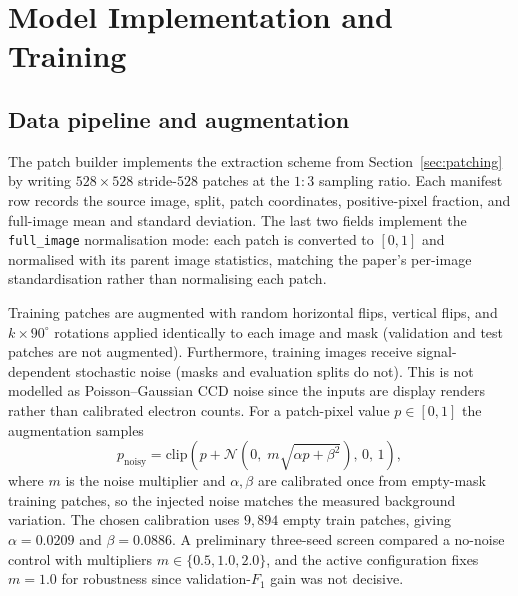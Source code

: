 \documentclass{cam-thesis}
\begin{document}
\chapter{Model Implementation and Training}
\label{ch:pipeline}

\section{Data pipeline and augmentation}
\label{sec:datapipeline}

The patch builder implements the extraction scheme from
Section~\ref{sec:patching} by writing $528\times528$ stride-$528$ patches at
the $1{:}3$ sampling ratio. Each manifest row records the source image,
split, patch coordinates, positive-pixel fraction, and full-image mean and standard
deviation. The last two fields implement the \texttt{full\_image}
normalisation mode: each patch is converted to $[0,1]$ and normalised with its
parent image statistics, matching the paper's per-image standardisation
rather than normalising each patch.

\label{sec:augmentation}

Training patches are augmented with random horizontal flips,
vertical flips, and $k\times90^{\circ}$ rotations applied identically to each
image and mask (validation and test patches are not augmented). Furthermore, training
images receive signal-dependent stochastic noise (masks and evaluation splits do not).
This is not modelled as Poisson--Gaussian CCD noise since the inputs are display renders
rather than calibrated electron counts.
For a patch-pixel value $p\in[0,1]$ the augmentation samples
\[
  p_{\mathrm{noisy}} =
  \mathrm{clip}\!\left(p + \mathcal{N}\!\left(0,\;
  m\sqrt{\alpha p + \beta^{2}}\right),\,0,\,1\right),
\]
where $m$ is the noise multiplier and $\alpha,\beta$ are calibrated once from
empty-mask training patches, so the injected noise matches the measured background
variation. The chosen calibration uses $9{,}894$ empty train patches, giving
$\alpha=0.0209$ and $\beta=0.0886$. A preliminary three-seed screen compared a
no-noise control with multipliers $m\in\{0.5,1.0,2.0\}$, and the active configuration
fixes $m=1.0$ for robustness since validation-$F_1$ gain was not decisive.
\end{document}
